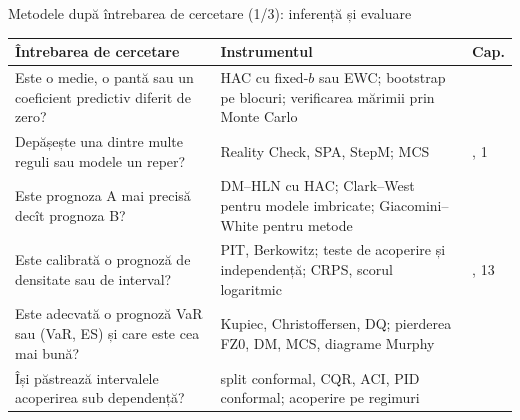 \begin{frame}{Metodele după întrebarea de cercetare (1/3): inferență și evaluare}
\itemsize{\small}
\begin{center}
\footnotesize
\begin{tabular}{>{\raggedright\arraybackslash}p{4.9cm}>{\raggedright\arraybackslash}p{5.6cm}>{\raggedright\arraybackslash}p{0.8cm}}
\toprule
\textbf{Întrebarea de cercetare} & \textbf{Instrumentul} & \textbf{Cap.} \\
\midrule
Este o medie, o pantă sau un coeficient predictiv diferit de zero? & HAC cu fixed-$b$ sau EWC; bootstrap pe blocuri; verificarea mărimii prin Monte Carlo & 0 \\
Depășește una dintre multe reguli sau modele un reper? & Reality Check, SPA, StepM; MCS & 0, 1 \\
Este prognoza A mai precisă decît prognoza B? & DM--HLN cu HAC; Clark--West pentru modele imbricate; Giacomini--White pentru metode & 1 \\
Este calibrată o prognoză de densitate sau de interval? & PIT, Berkowitz; teste de acoperire și independență; CRPS, scorul logaritmic & 1, 13 \\
Este adecvată o prognoză VaR sau (VaR, ES) și care este cea mai bună? & Kupiec, Christoffersen, DQ; pierderea FZ0, DM, MCS, diagrame Murphy & 9 \\
Își păstrează intervalele acoperirea sub dependență? & split conformal, CQR, ACI, PID conformal; acoperire pe regimuri & 13 \\
\bottomrule
\end{tabular}
\end{center}
\end{frame}

